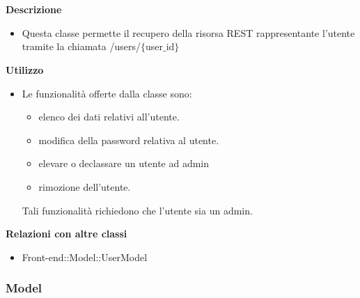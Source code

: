         \textbf{\\ \\ Descrizione} 
          \begin{itemize}
            \item[] Questa classe permette il recupero della risorsa REST rappresentante l'utente tramite la chiamata /users/$\{$user$\_$id$\}$
          \end{itemize}      
        \textbf{Utilizzo}  
          \begin{itemize}
            \item[] Le funzionalità offerte dalla classe sono: 
\begin{itemize} 
\item elenco dei dati relativi all'utente. 
\item modifica della password relativa al utente.
\item elevare o declassare un utente ad admin 
\item rimozione dell'utente.
\end{itemize}
Tali funzionalità richiedono che l'utente sia un admin.
          \end{itemize}
          \textbf{Relazioni con altre classi}
          \begin{itemize}
              \item{Front-end::Model::UserModel}
          \end{itemize}
  \subsubsection{Model}
